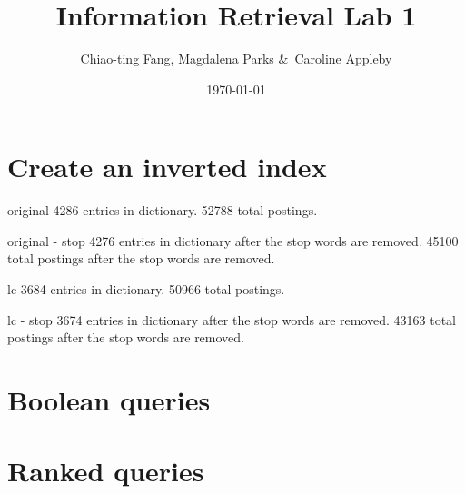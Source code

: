 \documentclass{article}
\title{Information Retrieval Lab 1}
\author{Chiao-ting Fang, Magdalena Parks \&\ Caroline Appleby}
\date{\today}
\begin{document}
\section{Create an inverted index}


original
4286  entries in dictionary.
52788  total postings.

original - stop
4276 entries in dictionary after the stop words are removed.                                                                    
45100 total postings after the stop words are removed. 

lc
3684  entries in dictionary.
50966  total postings.

lc - stop
3674 entries in dictionary after the stop words are removed.                                                                    
43163 total postings after the stop words are removed.  


\section{Boolean queries}



\section{Ranked queries}



\end{document}

